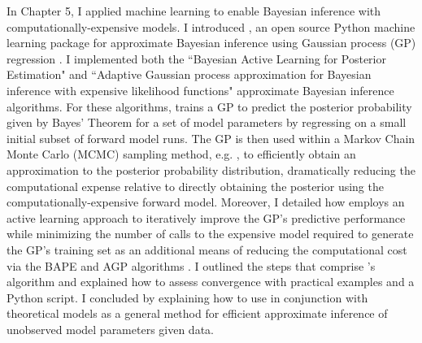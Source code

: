 In Chapter 5, I applied machine learning to enable Bayesian inference with computationally-expensive models. I introduced \approxposterior, an open source Python machine learning package for approximate Bayesian inference using Gaussian process (GP) regression \citep{FlemingVanderPlas2018}. I implemented both the ``Bayesian Active Learning for Posterior Estimation"  \citep[BAPE,][]{Kandasamy2017} and ``Adaptive Gaussian process approximation for Bayesian inference with expensive likelihood functions" \citep[AGP,][]{Wang2018} approximate Bayesian inference algorithms. For these algorithms, \approxposterior trains a GP to predict the posterior probability given by Bayes' Theorem for a set of model parameters by regressing on a small initial subset of forward model runs. The GP is then used within a Markov Chain Monte Carlo (MCMC) sampling method, e.g. \emcee \citep{ForemanMackey2013}, to efficiently obtain an approximation to the posterior probability distribution, dramatically reducing the computational expense relative to directly obtaining the posterior using the computationally-expensive forward model. Moreover, I detailed how \approxposterior employs an active learning approach to iteratively improve the GP's predictive performance while minimizing the number of calls to the expensive model required to generate the GP's training set as an additional means of reducing the computational cost via the BAPE and AGP algorithms \citep{Kandasamy2017,Wang2018}.  I outlined the steps that comprise \approxposterior's algorithm and explained how to assess convergence with practical examples and a Python script. I concluded by explaining how to use \approxposterior in conjunction with theoretical models as a general method for efficient approximate inference of unobserved model parameters given data.
 
